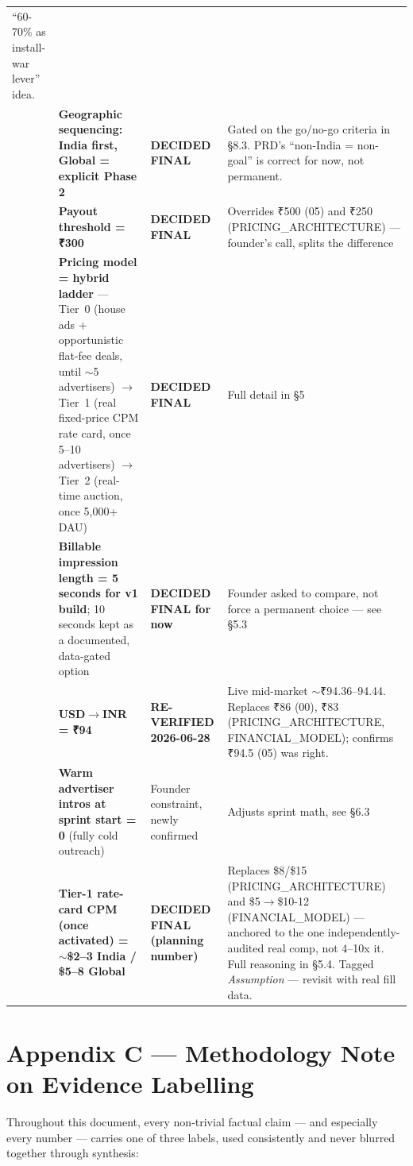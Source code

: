 {\begin{longtable}{p{0.4cm} p{5.1cm} p{2.4cm} p{4.6cm}}
``60-70\% as install-war lever'' idea. \\
\addlinespace
12 & \textbf{Geographic sequencing: India first, Global = explicit Phase 2} &
\textbf{DECIDED FINAL} & Gated on the go/no-go criteria in \S8.3. PRD's
``non-India = non-goal'' is correct for now, not permanent. \\
\addlinespace
13 & \textbf{Payout threshold = ₹300} & \textbf{DECIDED FINAL} & Overrides
₹500 (05) and ₹250 (PRICING\_ARCHITECTURE) --- founder's call, splits
the difference \\
\addlinespace
14 & \textbf{Pricing model = hybrid ladder} --- Tier~0 (house ads +
opportunistic flat-fee deals, until $\sim$5 advertisers) $\rightarrow$ Tier~1
(real fixed-price CPM rate card, once 5--10 advertisers) $\rightarrow$ Tier~2
(real-time auction, once 5{,}000+ DAU) & \textbf{DECIDED FINAL} & Full detail
in \S5 \\
\addlinespace
15 & \textbf{Billable impression length = 5 seconds for v1 build}; 10 seconds
kept as a documented, data-gated option & \textbf{DECIDED FINAL for now} &
Founder asked to compare, not force a permanent choice --- see \S5.3 \\
\addlinespace
16 & \textbf{USD$\rightarrow$INR = ₹94} & \textbf{RE-VERIFIED 2026-06-28} &
Live mid-market $\sim$₹94.36--94.44. Replaces ₹86 (00), ₹83
(PRICING\_ARCHITECTURE, FINANCIAL\_MODEL); confirms ₹94.5 (05) was
right. \\
\addlinespace
17 & \textbf{Warm advertiser intros at sprint start = 0} (fully cold outreach) &
Founder constraint, newly confirmed & Adjusts sprint math, see \S6.3 \\
\addlinespace
18 & \textbf{Tier-1 rate-card CPM (once activated) = $\sim$\$2--3 India /
\$5--8 Global} & \textbf{DECIDED FINAL (planning number)} & Replaces \$8/\$15
(PRICING\_ARCHITECTURE) and \$5$\rightarrow$\$10-12 (FINANCIAL\_MODEL) ---
anchored to the one independently-audited real comp, not 4--10x it. Full
reasoning in \S5.4. Tagged \emph{Assumption} --- revisit with real fill
data. \\
\bottomrule
\end{longtable}
}

\section{Appendix C --- Methodology Note on Evidence Labelling}
\label{app:methodology}

Throughout this document, every non-trivial factual claim --- and especially
every number --- carries one of three labels, used consistently and never
blurred together through synthesis:

